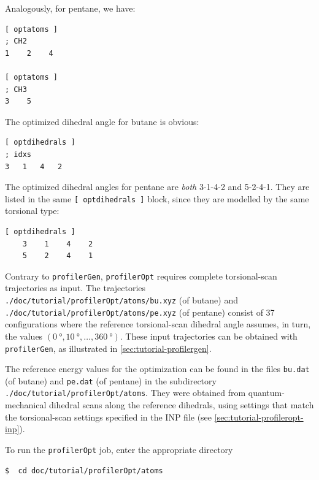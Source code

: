 \documentclass[10pt,a4paper,openany]{memoir}
\numberwithin{equation}{section}
\newcommand{\profileropt}[0]{\texttt{profilerOpt}}
\newcommand{\profilergen}[0]{\texttt{profilerGen}}
\begin{document}
\noindent Analogously, for pentane, we have:

\begin{lstlisting}[language=gromacs]
[ optatoms ]
; CH2
1    2    4

[ optatoms ]
; CH3
3    5
\end{lstlisting}\vspace{2ex}\par

The optimized dihedral angle for butane is obvious:

\begin{lstlisting}[language=gromacs]
[ optdihedrals ]
; idxs
3   1   4   2   
\end{lstlisting}\vspace{2ex}\par

\noindent{}
The optimized dihedral angles for pentane are \textit{both} 3-1-4-2
and 5-2-4-1.
%
They are listed in the same \texttt{[~optdihedrals~]} block, since
they are modelled by the same torsional type:

\begin{lstlisting}[language=gromacs]
[ optdihedrals ]
    3    1    4    2
    5	 2    4	   1
\end{lstlisting}\vspace{2ex}\par

Contrary to \profilergen{}, \profileropt{} requires complete
torsional-scan trajectories as input. The trajectories
\texttt{./doc/tutorial/profilerOpt/atoms/bu.xyz} (of butane) and
\texttt{./doc/tutorial/profilerOpt/atoms/pe.xyz} (of pentane) consist
of 37 configurations where the reference torsional-scan dihedral angle
assumes, in turn, the values
$(\SI{0}{\degree}, \SI{10}{\degree}, \ldots, \SI{360}{\degree})$.
These input trajectories can be obtained with \profilergen{}, as
illustrated in \autoref{sec:tutorial-profilergen}.

The reference energy values for the optimization can be found in the
files \texttt{bu.dat} (of butane) and \texttt{pe.dat} (of pentane) in
the subdirectory \texttt{./doc/tutorial/profilerOpt/atoms}. They were
obtained from quantum-mechanical dihedral scans along the reference
dihedrals, using settings that match the torsional-scan settings
specified in the INP file (see
\autoref{sec:tutorial-profileropt-inp}).

To run the \profileropt{} job, enter the appropriate directory

\begin{lstlisting}[language=bash]
$  cd doc/tutorial/profilerOpt/atoms
\end{lstlisting}\vspace{2ex}\par
\end{document}
